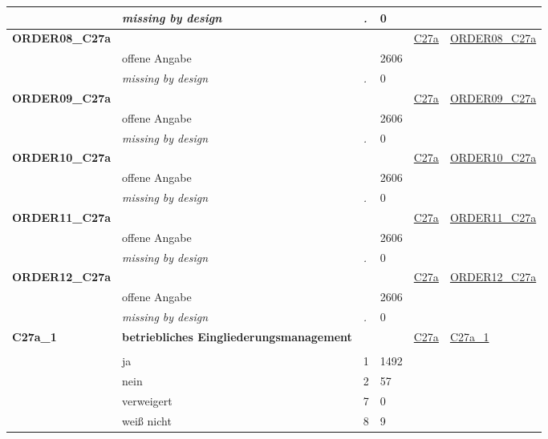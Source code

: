 \begin{longtable}{| L{2.45cm} | L{6cm} | C{1.5cm} | R{1cm} | C{2.25cm} | C{2.25cm} |}
   & \textit{missing by design} & \textit{.} & 0 &  &  \\ 
   \midrule
\textbf{ORDER08\_C27a}\label{var:ORDER08:C27a} & \textbf{} &  &  & \hyperref[C27a]{C27a} & \hyperref[var:suf:ORDER08:C27a]{ORDER08\_C27a} \\ 
   & offene Angabe &  & 2606 &  &  \\ 
   & \textit{missing by design} & \textit{.} & 0 &  &  \\ 
   \midrule
\textbf{ORDER09\_C27a}\label{var:ORDER09:C27a} & \textbf{} &  &  & \hyperref[C27a]{C27a} & \hyperref[var:suf:ORDER09:C27a]{ORDER09\_C27a} \\ 
   & offene Angabe &  & 2606 &  &  \\ 
   & \textit{missing by design} & \textit{.} & 0 &  &  \\ 
   \midrule
\textbf{ORDER10\_C27a}\label{var:ORDER10:C27a} & \textbf{} &  &  & \hyperref[C27a]{C27a} & \hyperref[var:suf:ORDER10:C27a]{ORDER10\_C27a} \\ 
   & offene Angabe &  & 2606 &  &  \\ 
   & \textit{missing by design} & \textit{.} & 0 &  &  \\ 
   \midrule
\textbf{ORDER11\_C27a}\label{var:ORDER11:C27a} & \textbf{} &  &  & \hyperref[C27a]{C27a} & \hyperref[var:suf:ORDER11:C27a]{ORDER11\_C27a} \\ 
   & offene Angabe &  & 2606 &  &  \\ 
   & \textit{missing by design} & \textit{.} & 0 &  &  \\ 
   \midrule
\textbf{ORDER12\_C27a}\label{var:ORDER12:C27a} & \textbf{} &  &  & \hyperref[C27a]{C27a} & \hyperref[var:suf:ORDER12:C27a]{ORDER12\_C27a} \\ 
   & offene Angabe &  & 2606 &  &  \\ 
   & \textit{missing by design} & \textit{.} & 0 &  &  \\ 
   \midrule
\textbf{C27a\_1}\label{var:C27a:1} & \textbf{betriebliches Eingliederungsmanagement} &  &  & \hyperref[C27a]{C27a} & \hyperref[var:suf:C27a:1]{C27a\_1} \\ 
   &  &  &  &  &  \\ 
   & ja & 1 & 1492 &  &  \\ 
   & nein & 2 & 57 &  &  \\ 
   & verweigert & 7 & 0 &  &  \\ 
   & weiß nicht & 8 & 9 &  &  \\ 

\end{longtable}
